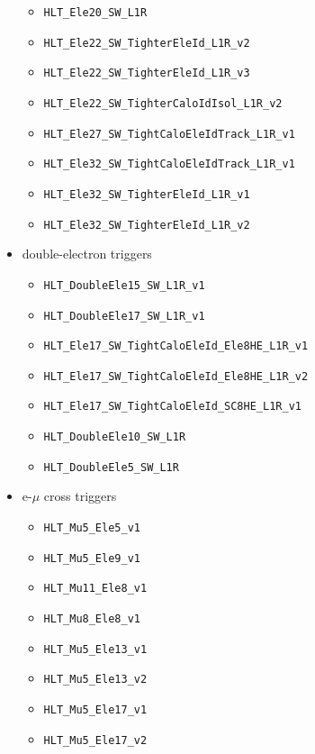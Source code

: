 \begin{itemize}
\begin{itemize}
  \item \verb=HLT_Ele20_SW_L1R=
  \item \verb=HLT_Ele22_SW_TighterEleId_L1R_v2=
  \item \verb=HLT_Ele22_SW_TighterEleId_L1R_v3=
  \item \verb=HLT_Ele22_SW_TighterCaloIdIsol_L1R_v2=
  \item \verb=HLT_Ele27_SW_TightCaloEleIdTrack_L1R_v1=
  \item \verb=HLT_Ele32_SW_TightCaloEleIdTrack_L1R_v1=
  \item \verb=HLT_Ele32_SW_TighterEleId_L1R_v1=
  \item \verb=HLT_Ele32_SW_TighterEleId_L1R_v2=
  \end{itemize}
\item double-electron triggers
  \begin{itemize}
  \item \verb=HLT_DoubleEle15_SW_L1R_v1=                
  \item \verb=HLT_DoubleEle17_SW_L1R_v1=  
  \item \verb=HLT_Ele17_SW_TightCaloEleId_Ele8HE_L1R_v1=
  \item \verb=HLT_Ele17_SW_TightCaloEleId_Ele8HE_L1R_v2=
  \item \verb=HLT_Ele17_SW_TightCaloEleId_SC8HE_L1R_v1=
  \item \verb=HLT_DoubleEle10_SW_L1R=
  \item \verb=HLT_DoubleEle5_SW_L1R=
  \end{itemize}
\item e-$\mu$ cross triggers
  \begin{itemize}
  \item \verb=HLT_Mu5_Ele5_v1=
  \item \verb=HLT_Mu5_Ele9_v1=
  \item \verb=HLT_Mu11_Ele8_v1=
  \item \verb=HLT_Mu8_Ele8_v1=
  \item \verb=HLT_Mu5_Ele13_v1=
  \item \verb=HLT_Mu5_Ele13_v2=
  \item \verb=HLT_Mu5_Ele17_v1=
  \item \verb=HLT_Mu5_Ele17_v2=
  \end{itemize}
\end{itemize}
